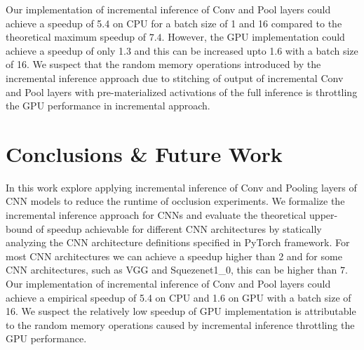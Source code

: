 \documentclass[10, sigconf]{acmart}
\begin{document}
Our implementation of incremental inference of Conv and Pool layers could achieve a speedup of 5.4 on CPU for a batch size of 1 and 16 compared to the theoretical maximum speedup of $7.4$. However, the GPU implementation could achieve a speedup of only 1.3 and this can be increased upto 1.6 with a batch size of 16. We suspect that the random memory operations introduced by the incremental inference approach due to stitching of output of incremental Conv and Pool layers with pre-materialized activations of the full inference is  throttling the GPU performance in incremental approach.

\section{Conclusions \& Future Work}
In this work explore applying incremental inference of Conv and Pooling layers of CNN models to reduce the runtime of occlusion experiments.
We formalize the incremental inference approach for CNNs and evaluate the theoretical upper-bound of speedup achievable for different CNN architectures by statically analyzing the CNN architecture definitions specified in PyTorch framework.
For most CNN architectures we can achieve a speedup higher than 2 and for some CNN architectures, such as VGG and Squezenet1\_0, this can be higher than $7$.
Our implementation of incremental inference of Conv and Pool layers could achieve a empirical speedup of 5.4 on CPU and 1.6 on GPU with a batch size of 16. We suspect the relatively low speedup of GPU implementation is attributable to the random memory operations caused by incremental inference throttling the GPU performance.
\end{document}
